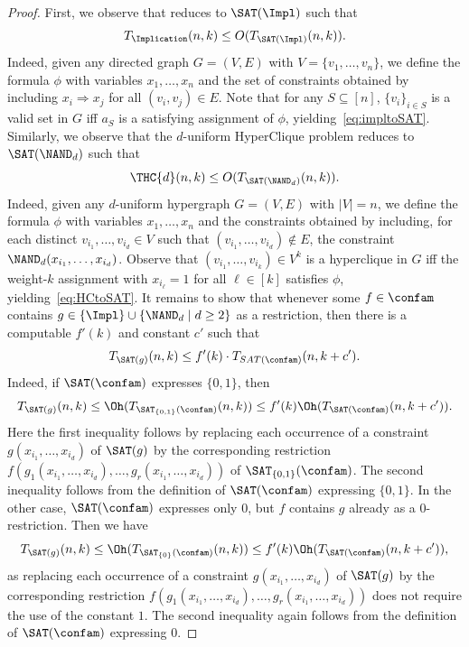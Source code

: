 \begin{proof}
First, we observe that \Implication reduces to $\SAT(\Impl)$ such that 
\begin{equation}\label{eq:impltoSAT}
T_\Implication(n,k)\le O(T_{\SAT(\Impl)}(n,k)).
\end{equation}
Indeed, given any directed graph $G=(V,E)$ with $V=\{v_1,\dots,v_n\}$, we define the formula $\phi$ with variables $x_1,\dots,x_n$ and the set of constraints obtained by including $x_i \Rightarrow x_j$ for all $(v_i,v_j)\in E$. Note that for any $S\subseteq [n]$, $\{v_i\}_{i\in S}$ is a valid set in $G$ iff $a_S$ is a satisfying assignment of $\phi$, yielding~\eqref{eq:impltoSAT}.
%
Similarly, we observe that the $d$-uniform HyperClique problem reduces to $\SAT(\NAND_d)$ such that 
\begin{equation}\label{eq:HCtoSAT}
\THC{d}(n,k)\le O(T_{\SAT(\NAND_d)}(n,k)).
\end{equation}
Indeed, given any $d$-uniform hypergraph $G=(V,E)$ with $|V|= n$, we define the formula $\phi$ with variables $x_1,\dots,x_n$ and the constraints obtained by including, for each distinct $v_{i_1},\dots,v_{i_d}\in V$ such that $(v_{i_1},\dots,v_{i_d}) \notin E$, the constraint $\NAND_d(x_{i_1}, \dots, x_{i_d})$. Observe that $(v_{i_1},\dots,v_{i_k})\in V^k$ is a hyperclique in $G$ iff the weight-$k$ assignment with $x_{i_\ell}=1$ for all $\ell \in [k]$ satisfies $\phi$, yielding~\eqref{eq:HCtoSAT}. 
%
It remains to show that whenever some $f\in \confam$ contains $g \in \{\Impl\} \cup \{\NAND_d \mid d\ge 2\}$ as a restriction, then there is a computable $f'(k)$ and constant $c'$ such that
\begin{equation}\label{eq:restToFam}
T_{\SAT(g)}(n,k) \le f'(k) \cdot T_{SAT(\confam)}(n,k+c').
\end{equation}
Indeed, if $\SAT(\confam)$ expresses $\{0,1\}$, then 
\[ T_{\SAT(g)}(n,k) \le \Oh(T_{\SAT_{\{0,1\}}(\confam)}(n,k)) \le f'(k) \Oh(T_{\SAT(\confam)}(n,k+c')). \]
Here the first inequality follows by replacing each occurrence of a constraint $g(x_{i_1},\dots,x_{i_d})$ of $\SAT(g)$ by the corresponding restriction $f(g_1(x_{i_1},\dots,x_{i_d}),\dots, g_r(x_{i_1},\dots,x_{i_d}))$ of $\SAT_{\{0,1\}}(\confam)$. The second inequality follows from the definition of $\SAT(\confam)$ expressing $\{0,1\}$.
%
In the other case, $\SAT(\confam)$ expresses only $0$, but $f$ contains $g$ already as a $0$-restriction. Then we have
\[ T_{\SAT(g)}(n,k) \le \Oh(T_{\SAT_{\{0\}}(\confam)}(n,k)) \le f'(k) \Oh(T_{\SAT(\confam)}(n,k+c')), \]
as replacing each occurrence of a constraint $g(x_{i_1},\dots,x_{i_d})$ of $\SAT(g)$ by the corresponding restriction $f(g_1(x_{i_1},\dots,x_{i_d}),\dots, g_r(x_{i_1},\dots,x_{i_d}))$ does not require the use of the constant $1$. The second inequality again follows from the definition of $\SAT(\confam)$ expressing $0$.

\end{proof}
